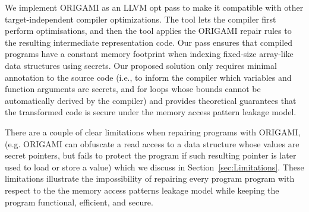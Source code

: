 We implement ORIGAMI as an LLVM opt pass to make it compatible with other target-independent compiler optimizations. The tool lets the compiler first perform optimisations, and then the tool applies the ORIGAMI repair rules to the resulting intermediate representation code. Our pass ensures that compiled programs have a constant memory footprint when indexing fixed-size array-like data structures using secrets. Our proposed solution only requires minimal annotation to the source code (i.e., to inform the compiler which variables and function arguments are secrets, and for loops whose bounds cannot be automatically derived by the compiler) and provides theoretical guarantees that the transformed code is secure under the memory access pattern leakage model. 

There are a couple of clear limitations when repairing programs with ORIGAMI, (e.g. ORIGAMI can obfuscate a read access to a data structure whose values are secret pointers, but fails to protect the program if such resulting pointer is later used to load or store a value) which we discuss in Section~\ref{sec:Limitations}. These limitations illustrate the impossibility of repairing every program program with respect to the the memory access patterns leakage model while keeping the program functional, efficient, and secure. 






